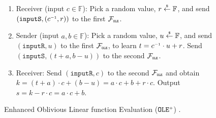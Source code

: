 \begin{figure}[ht]
\setlength{\fboxsep}{1pt}
\begin{center}
\begin{boxedminipage}{12.3cm}
\begin{small}
\begin{enumerate}
%
\item  Receiver (input $c \in \mathbb{F} $): Pick a random value, $r\stackrel{\scriptscriptstyle\$}\leftarrow  \mathbb{F} $, and send  $(\mathtt{inputS}, (c^{\scriptscriptstyle -1}, r))$ to the first $\mathcal{F}_{\scriptscriptstyle\mathtt{OLE}}$.
%
%
\item Sender (input $a, b \in \mathbb{F} $): Pick a random value, $u \stackrel{\scriptscriptstyle\$}\leftarrow  \mathbb{F} $, and send $(\mathtt{inputR}, u)$ to the first $\mathcal{F}_{\scriptscriptstyle\mathtt{OLE}}$, to learn $t =  c^{\scriptscriptstyle -1}\cdot u
 + r$. Send $(\mathtt{inputS},(t + a, b - u))$ to the second $\mathcal{F}_{\scriptscriptstyle\mathtt{OLE}}$.
%
\item Receiver: Send $(\mathtt{inputR}, c)$ to the second $\mathcal{F}_{\scriptscriptstyle\mathtt{OLE}}$ and obtain $k = (t+a)\cdot c+(b-u)=a\cdot c + b + r\cdot c$. Output $s=k - r\cdot c=a\cdot c + b$.

\end{enumerate}
\end{small}
\end{boxedminipage}
\end{center}
\caption{
\small {Enhanced Oblivious Linear function Evaluation  ($\mathtt{OLE}^{\scriptscriptstyle +}$)  \cite{GhoshN19}}.} 
\label{fig:OLE-plus-protocol}
\end{figure}
